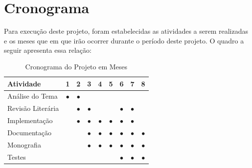 \documentclass[
	12pt,				    %
	openright,			    %
	oneside,			    %
	a4paper,			    %
    sumario=tradicional,    %
	english,			    %
	brazil,				    %
	]{abntex2}              %
\begin{document}
\chapter{Cronograma}\label{sec:cronograma}

Para execução deste projeto, foram estabelecidas as atividades a serem realizadas e os meses que em que irão ocorrer durante o período deste projeto. O quadro a seguir apresenta essa relação:

\par

\begin{table}[htbp]
	\centering
	\caption[Cronograma mensal]{Cronograma do Projeto em Meses}
	\label{tab:cronogramaMensal}
	\begin{tabular}{lcccccccc} %
		\toprule
		\textbf{Atividade} & \textbf{1} & \textbf{2} & \textbf{3} & \textbf{4} & \textbf{5} & \textbf{6} & \textbf{7} & \textbf{8} \\
		\midrule
		Análise do Tema    & $\bullet$  & $\bullet$  &            &            &            &            &            &            \\
		Revisão Literária  &            & $\bullet$  & $\bullet$  &            &            & $\bullet$  & $\bullet$  &            \\
		Implementação      &            & $\bullet$  & $\bullet$  & $\bullet$  & $\bullet$  & $\bullet$  & $\bullet$  &            \\
		Documentação       &            &            & $\bullet$  & $\bullet$  & $\bullet$  & $\bullet$  & $\bullet$  & $\bullet$  \\
		Monografia         &            &            & $\bullet$  & $\bullet$  & $\bullet$  & $\bullet$  & $\bullet$  & $\bullet$  \\
		Testes             &            &            &            &            &            & $\bullet$  & $\bullet$  & $\bullet$  \\
		\bottomrule
	\end{tabular}
\end{table}



\end{document}
